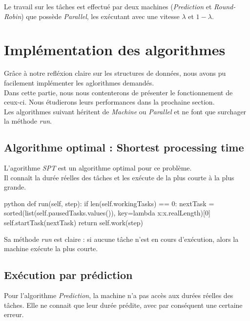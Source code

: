 \documentclass[12pt]{article}
\begin{document}
Le travail sur les tâches est effectué par deux machines (\emph{Prediction} et \emph{Round-Robin}) que possède \emph{Parallel}, les exécutant avec une vitesse $\lambda$ et $1 - \lambda$.

\newpage
\section{Implémentation des algorithmes}

Grâce à notre refléxion claire sur les structures de données, nous avons pu facilement implémenter les aglorithmes demandés. \\

Dans cette partie, nous nous contenterons de présenter le fonctionnement de ceux-ci. Nous étudierons leurs performances dans la prochaine section. \\

Les algorithmes suivant héritent de \emph{Machine} ou \emph{Parallel} et ne font que surchager la méthode \emph{run}. \\

\subsection{Algorithme optimal : Shortest processing time}

L'agorithme \emph{SPT} est un algorithme optimal pour ce problème. \\

Il connaît la durée réelles des tâches et les exécute de la plus courte à la plus grande. \\ 

\begin{mintedbox}{python}
    def run(self, step):
        if len(self.workingTasks) == 0:
            nextTask = sorted(list(self.pausedTasks.values()), key=lambda x:x.realLength)[0]
            self.startTask(nextTask)
        return self.work(step)
\end{mintedbox}

Sa méthode \emph{run} est claire : si aucune tâche n'est en cours d'exécution, alors la machine exécute la plus courte.

\subsection{Exécution par prédiction}

Pour l'algorithme \emph{Prediction}, la machine n'a pas accès aux durées réelles des tâches. Elle ne connait que leur durée prédite, avec par conséquent une certaine erreur. \\
\end{document}
